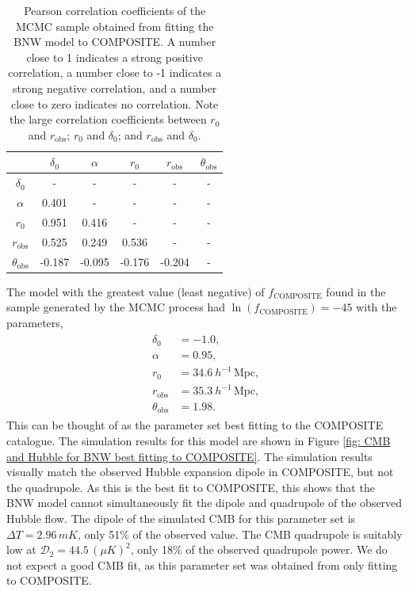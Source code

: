 \documentclass[a4paper,12pt]{report}
\begin{document}
\begin{table}[t]
    \centering
    \begin{tabular}{c|c c c c c}
         & $\delta_0$ & $\alpha$ & $r_0$ & $r_\text{obs}$ & $\theta_\text{obs}$\\
         \hline
        $\delta_0$ & - & - & - & - & - \\
        $\alpha$ & 0.401 & - & - & - & - \\
        $r_0$ & 0.951 & 0.416 & - & - & - \\
        $r_\text{obs}$ & 0.525 & 0.249 & 0.536 & - & - \\
        $\theta_\text{obs}$ & -0.187 & -0.095 & -0.176 & -0.204 & -
    \end{tabular}
    \caption{Pearson correlation coefficients of the MCMC sample obtained from fitting the BNW model to COMPOSITE. A number close to 1 indicates a strong positive correlation, a number close to -1 indicates a strong negative correlation, and a number close to zero indicates no correlation. Note the large correlation coefficients between $r_0$ and $r_\text{obs}$; $r_0$ and $\delta_0$; and $r_\text{obs}$ and $\delta_0$.}
    \label{tab: BNW correlation coefficients}
\end{table}

The model with the greatest value (least negative) of $f_\text{COMPOSITE}$ found in the sample generated by the MCMC process had $\ln(f_\text{COMPOSITE}) = -45$ with the parameters,
\begin{align}
    \begin{split} \label{eqn: best BNW COMPOSITE fit}
        \delta_0 &= -1.0, \\
        \alpha &= 0.95, \\
        r_0 &= 34.6\: h^{-1}\,\text{Mpc}, \\
        r_\text{obs} &= 35.3\: h^{-1}\,\text{Mpc}, \\
        \theta_\text{obs} &= 1.98.
    \end{split}
\end{align}
This can be thought of as the parameter set best fitting to the COMPOSITE catalogue. The simulation results for this model are shown in Figure \ref{fig: CMB and Hubble for BNW best fitting to COMPOSITE}. The simulation results visually match the observed Hubble expansion dipole in COMPOSITE, but not the quadrupole. As this is the best fit to COMPOSITE, this shows that the BNW model cannot simultaneously fit the dipole and quadrupole of the observed Hubble flow. The dipole of the simulated CMB for this parameter set is $\Delta T = 2.96\, \si{mK}$, only 51\% of the observed value. The CMB quadrupole is suitably low at $\mathcal{D}_2 = 44.5\, (\mu \si{K})^2$, only 18\% of the observed quadrupole power. We do not expect a good CMB fit, as this parameter set was obtained from only fitting to COMPOSITE.
\end{document}
